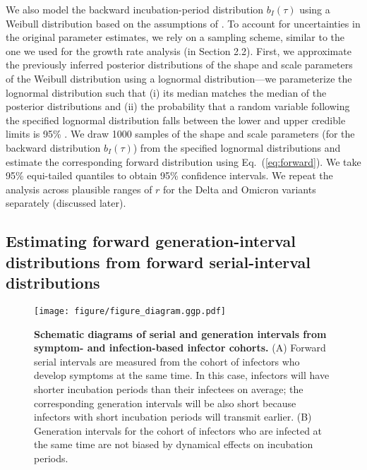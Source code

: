 \documentclass[12pt]{article}
\newcommand{\eref}[1]{Eq.~(\ref{eq:#1})}
\begin{document}
We also model the backward incubation-period distribution $b_I(\tau)$ using a Weibull distribution based on the assumptions of \cite{backer2021omicron}.
To account for uncertainties in the original parameter estimates, we rely on a sampling scheme, similar to the one we used for the growth rate analysis (in Section 2.2).
First, we approximate the previously inferred posterior distributions of the shape and scale parameters of the Weibull distribution using a lognormal distribution---we parameterize the lognormal distribution such that (i) its median matches the median of the posterior distributions and (ii) the probability that a random variable following the specified lognormal distribution falls between the lower and upper credible limits is 95\% \citep{park2020reconciling}.
We draw 1000 samples of the shape and scale parameters (for the backward distribution $b_I(\tau)$) from the specified lognormal distributions and estimate the corresponding forward distribution using \eref{forward}.
We take 95\% equi-tailed quantiles to obtain 95\% confidence intervals.
We repeat the analysis across plausible ranges of $r$ for the Delta and Omicron variants separately (discussed later).

\subsection{Estimating forward generation-interval distributions from forward serial-interval distributions}

\begin{figure}[!tp]
\texttt{[image: figure/figure\_diagram.ggp.pdf]}
\caption{
\textbf{Schematic diagrams of serial and generation intervals from symptom- and infection-based infector cohorts.}
(A) Forward serial intervals are measured from the cohort of infectors who develop symptoms at the same time. 
In this case, infectors will have shorter incubation periods than their infectees on average; the corresponding generation intervals will be also short because infectors with short incubation periods will transmit earlier.
(B) Generation intervals for the cohort of infectors who are infected at the same time are not biased by dynamical effects on incubation periods.
\label{fig:diagram}
}
\end{figure}
\end{document}
